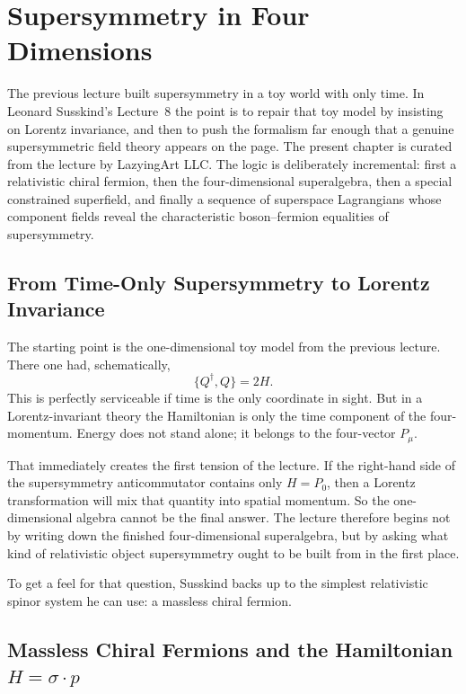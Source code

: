 \chapter{Supersymmetry in Four Dimensions}

The previous lecture built supersymmetry in a toy world with only time. In Leonard Susskind's Lecture~8 the point is to repair that toy model by insisting on Lorentz invariance, and then to push the formalism far enough that a genuine supersymmetric field theory appears on the page. The present chapter is curated from the lecture by LazyingArt LLC. The logic is deliberately incremental: first a relativistic chiral fermion, then the four-dimensional superalgebra, then a special constrained superfield, and finally a sequence of superspace Lagrangians whose component fields reveal the characteristic boson--fermion equalities of supersymmetry.

\section{From Time-Only Supersymmetry to Lorentz Invariance}

The starting point is the one-dimensional toy model from the previous lecture. There one had, schematically,
\begin{equation}
\{Q^\dagger,Q\}=2H.
\end{equation}
This is perfectly serviceable if time is the only coordinate in sight. But in a Lorentz-invariant theory the Hamiltonian is only the time component of the four-momentum. Energy does not stand alone; it belongs to the four-vector \(P_\mu\).

That immediately creates the first tension of the lecture. If the right-hand side of the supersymmetry anticommutator contains only \(H=P_0\), then a Lorentz transformation will mix that quantity into spatial momentum. So the one-dimensional algebra cannot be the final answer. The lecture therefore begins not by writing down the finished four-dimensional superalgebra, but by asking what kind of relativistic object supersymmetry ought to be built from in the first place.

To get a feel for that question, Susskind backs up to the simplest relativistic spinor system he can use: a massless chiral fermion.

\section{Massless Chiral Fermions and the Hamiltonian \(H=\sigma\cdot p\)}

